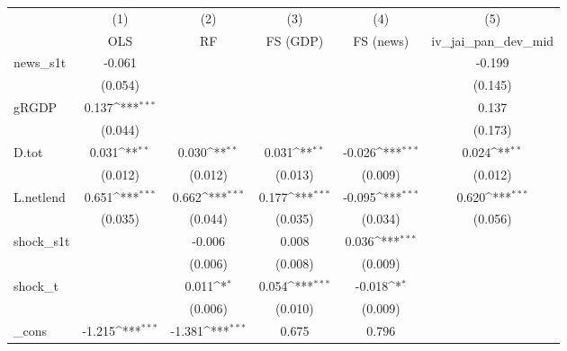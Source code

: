 {
\def\sym#1{\ifmmode^{#1}\else\(^{#1}\)\fi}
\begin{tabular}{l*{5}{c}}
\toprule
            &\multicolumn{1}{c}{(1)}&\multicolumn{1}{c}{(2)}&\multicolumn{1}{c}{(3)}&\multicolumn{1}{c}{(4)}&\multicolumn{1}{c}{(5)}\\
            &\multicolumn{1}{c}{OLS}&\multicolumn{1}{c}{RF}&\multicolumn{1}{c}{FS (GDP)}&\multicolumn{1}{c}{FS (news)}&\multicolumn{1}{c}{iv\_jai\_pan\_dev\_mid}\\
\midrule
news\_s1t    &      -0.061         &                     &                     &                     &      -0.199         \\
            &     (0.054)         &                     &                     &                     &     (0.145)         \\
\addlinespace
gRGDP       &       0.137\sym{***}&                     &                     &                     &       0.137         \\
            &     (0.044)         &                     &                     &                     &     (0.173)         \\
\addlinespace
D.tot       &       0.031\sym{**} &       0.030\sym{**} &       0.031\sym{**} &      -0.026\sym{***}&       0.024\sym{**} \\
            &     (0.012)         &     (0.012)         &     (0.013)         &     (0.009)         &     (0.012)         \\
\addlinespace
L.netlend   &       0.651\sym{***}&       0.662\sym{***}&       0.177\sym{***}&      -0.095\sym{***}&       0.620\sym{***}\\
            &     (0.035)         &     (0.044)         &     (0.035)         &     (0.034)         &     (0.056)         \\
\addlinespace
shock\_s1t   &                     &      -0.006         &       0.008         &       0.036\sym{***}&                     \\
            &                     &     (0.006)         &     (0.008)         &     (0.009)         &                     \\
\addlinespace
shock\_t     &                     &       0.011\sym{*}  &       0.054\sym{***}&      -0.018\sym{*}  &                     \\
            &                     &     (0.006)         &     (0.010)         &     (0.009)         &                     \\
\addlinespace
\_cons      &      -1.215\sym{***}&      -1.381\sym{***}&       0.675         &       0.796         &                     \\

\end{tabular}}
